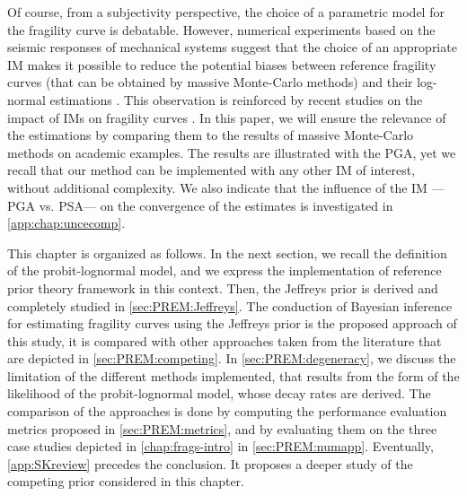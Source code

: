 Of course, from a subjectivity perspective, the choice of a parametric model for the fragility curve is debatable. However, numerical experiments based on the seismic responses of mechanical systems suggest that the choice of an appropriate IM makes it possible to reduce the potential biases between reference fragility curves (that can be obtained by massive Monte-Carlo methods) and their log-normal estimations \citep{gauchy_importance_2021}. This observation is reinforced by recent studies on the impact of IMs on fragility curves \citep{sainct_efficient_2020,ciano_role_2020,ciano_novel_2022}. In this paper, we will ensure the relevance of the estimations by comparing them to the results of massive Monte-Carlo methods on academic examples. 
The results are illustrated with the PGA, yet we recall that our method can be implemented with any other IM of interest, without additional complexity.
We also indicate that the influence of the IM ---PGA vs. PSA--- on the convergence of the estimates is investigated in   \cref{app:chap:uncecomp}.


This chapter is organized as follows. In the next section, we recall the definition of the probit-lognormal model, and we express the implementation of reference prior theory framework in this context.
Then, the Jeffreys prior is derived and completely studied in \cref{sec:PREM:Jeffreys}. The conduction of Bayesian inference for estimating fragility curves using the Jeffreys prior is the proposed approach of this study, it is compared with other approaches taken from the literature that are depicted in \cref{sec:PREM:competing}. %
In \cref{sec:PREM:degeneracy}, we discuss the limitation of the different methods implemented, that results from the form of the likelihood of the probit-lognormal model, whose decay rates are derived.
The comparison of the approaches is done by computing the performance evaluation metrics proposed in \cref{sec:PREM:metrics}, and by evaluating  them on the three case studies depicted in   \cref{chap:frags-intro} in \cref{sec:PREM:numapp}.
Eventually, \cref{app:SKreview} precedes the conclusion. %
It proposes a deeper study of the competing prior considered in this chapter.





